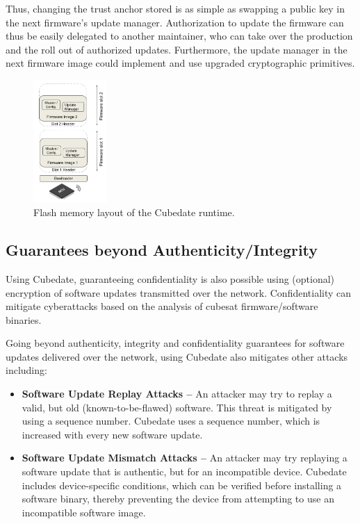 Thus, changing the trust anchor stored is as simple as swapping a public key in the next firmware's update manager.
Authorization to update the firmware can thus be easily  delegated to another maintainer, 
who can take over the production and the roll out of authorized updates.
Furthermore, the update manager in the next firmware image could
implement and use upgraded cryptographic primitives. 

\begin{figure}[t]
\begin{center}
    \includegraphics[width=0.25\textwidth]{Figures/Cubedate-slots.png}
    \caption{Flash memory layout of the Cubedate runtime.}
    \label{fig:cubedate-runtime}
\end{center}
\end{figure}

\subsection{Guarantees beyond Authenticity/Integrity}

Using Cubedate, guaranteeing confidentiality is also possible using (optional) encryption of software updates transmitted over the network.
Confidentiality can mitigate cyberattacks based on the analysis of cubesat firmware/software binaries.

Going beyond authenticity, integrity and confidentiality guarantees for software updates delivered over the network, using Cubedate also mitigates other attacks including:
\begin{itemize}
\item {\bf Software Update Replay Attacks –} An attacker may try to replay a valid, but old (known-to-be-flawed) software. This threat is mitigated by using a sequence number. Cubedate uses a sequence number, which is increased with every new software update.

\item {\bf Software Update Mismatch Attacks –} An attacker may try replaying a software update that is authentic, but for an incompatible device. Cubedate includes device-specific conditions, which can be verified before installing a software binary, thereby preventing the device from attempting to use an incompatible software image.
\end{itemize}

